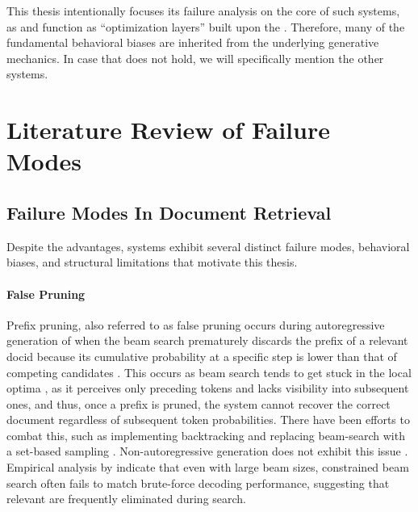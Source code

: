 This thesis intentionally focuses its failure analysis on the core of such systems, as  and  function as ``optimization layers'' built upon the . Therefore, many of the fundamental behavioral biases are inherited from the underlying generative mechanics. In case that does not hold, we will specifically mention the other systems.


\section{Literature Review of Failure Modes} 
\label{sec:failure-modes-literature}

\subsection{Failure Modes In Document Retrieval}
Despite the advantages,  systems exhibit several distinct failure modes, behavioral biases, and structural limitations that motivate this thesis.

\paragraph{False Pruning}
\label{par:false-pruning}

Prefix pruning, also referred to as false pruning occurs during autoregressive generation of  when the beam search prematurely discards the prefix of a relevant docid because its cumulative probability at a specific step is lower than that of competing candidates \cite{peitian-zhang-generative-retrieval,hansi-zeng-planning-ahead,weiwei-sun-learning-to,hansi-zeng-scalable-and}. This occurs as beam search tends to get stuck in the local optima \cite{felix-stahlberg-on-nmt}, as it perceives only preceding tokens and lacks visibility into subsequent ones, and thus, once a prefix is pruned, the system cannot recover the correct document regardless of subsequent token probabilities. There have been efforts to combat this, such as implementing backtracking \cite{r-zhou-beamstack-search} and replacing beam-search with a set-based sampling \cite{peitian-zhang-generative-retrieval}. Non-autoregressive generation does not exhibit this issue \cite{ravisri-valluri-scaling-the,xinpeng-zhao-diffugr-generative}. Empirical analysis by \citet{hansi-zeng-planning-ahead} indicate that even with large beam sizes, constrained beam search often fails to match brute-force decoding performance, suggesting that relevant  are frequently eliminated during search.

